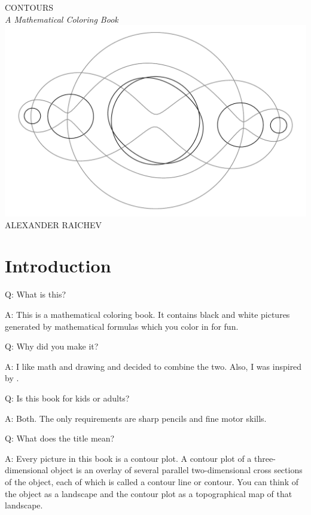 \documentclass[12pt, a4paper]{amsart}
\begin{document}
\begin{titlepage}

\noindent
\begin{center}
{\fontsize{2cm}{1em}\selectfont CONTOURS}\\[1.5em]
{\fontsize{0.7cm}{1em}\selectfont\itshape A Mathematical Coloring Book}\\[4em]
\includegraphics[width=160mm, angle=90]{cover.pdf}\\
\vfill
{\fontsize{0.6cm}{1em}\selectfont ALEXANDER RAICHEV}
\end{center}
\end{titlepage}

\section*{Introduction}

Q: What is this?

A: This is a mathematical coloring book.
It contains black and white pictures generated by mathematical formulas which you color in for fun.

Q: Why did you make it? 

A: I like math and drawing and decided to combine the two.
Also, I was inspired by \cite{Hamp2009}.

Q: Is this book for kids or adults?

A: Both.
The only requirements are sharp pencils and fine motor skills.

Q: What does the title mean? 

A: Every picture in this book is a contour plot.
A contour plot of a three-dimensional object is an overlay of several parallel two-dimensional cross sections of the object, each of which is called a contour line or contour.
You can think of the object as a landscape and the contour plot as a topographical map of that landscape.
\end{document}
